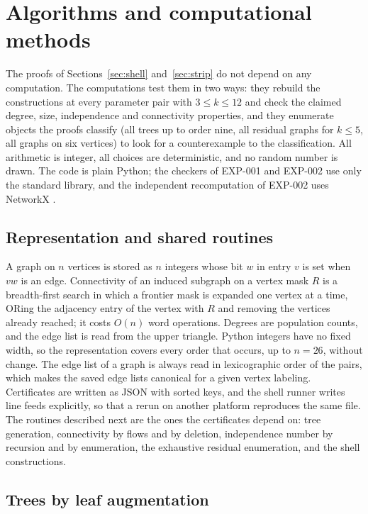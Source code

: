 \section{Algorithms and computational methods}\label{sec:computations}

The proofs of Sections~\ref{sec:shell} and~\ref{sec:strip} do not depend on any computation.
The computations test them in two ways: they rebuild the constructions at every parameter pair with $3\le k\le12$ and check the claimed degree, size, independence and connectivity properties, and they enumerate objects the proofs classify (all trees up to order nine, all residual graphs for $k\le5$, all graphs on six vertices) to look for a counterexample to the classification.
All arithmetic is integer, all choices are deterministic, and no random number is drawn.
The code is plain Python; the checkers of EXP-001 and EXP-002 use only the standard library, and the independent recomputation of EXP-002 uses NetworkX \cite{NetworkX}.

\subsection{Representation and shared routines}\label{sec:comp-repr}

A graph on $n$ vertices is stored as $n$ integers whose bit $w$ in entry $v$ is set when $vw$ is an edge.
Connectivity of an induced subgraph on a vertex mask $R$ is a breadth-first search in which a frontier mask is expanded one vertex at a time, ORing the adjacency entry of the vertex with $R$ and removing the vertices already reached; it costs $O(n)$ word operations.
Degrees are population counts, and the edge list is read from the upper triangle.
Python integers have no fixed width, so the representation covers every order that occurs, up to $n=26$, without change.
The edge list of a graph is always read in lexicographic order of the pairs, which makes the saved edge lists canonical for a given vertex labeling.
Certificates are written as JSON with sorted keys, and the shell runner writes line feeds explicitly, so that a rerun on another platform reproduces the same file.
The routines described next are the ones the certificates depend on: tree generation, connectivity by flows and by deletion, independence number by recursion and by enumeration, the exhaustive residual enumeration, and the shell constructions.

\subsection{Trees by leaf augmentation}\label{sec:comp-trees}

